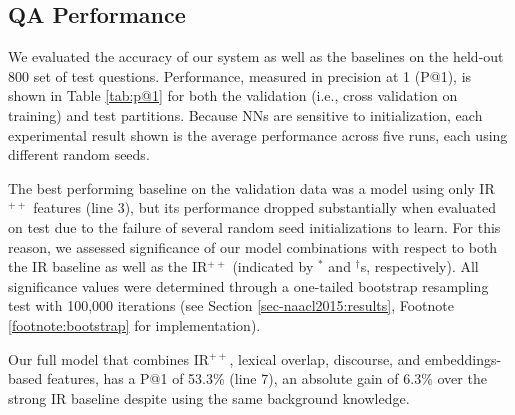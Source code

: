 \subsection{QA Performance}
\label{sec-emnlp2017:accuracy}
We evaluated the accuracy of our system as well as the baselines on the held-out 800 set of test questions.  Performance, measured in precision at 1 (P@1)\citep{manning08}, is shown in Table \ref{tab:p@1} for both the validation (i.e., cross validation on training) and test partitions.  Because NNs are sensitive to initialization, each experimental result shown is the average performance across five runs, each using different random seeds.   

The best performing baseline on the validation data was a model using only IR$^{++}$ features (line 3), but its performance dropped substantially when evaluated on test due to the failure of several random seed initializations to learn.  For this reason, we assessed significance of our model combinations with respect to both the IR baseline as well as the IR$^{++}$ (indicated by $^*$ and $^{\dagger}$s, respectively). All significance values were determined through a one-tailed bootstrap resampling test with 100,000 iterations (see Section \ref{sec-naacl2015:results}, Footnote \ref{footnote:bootstrap} for implementation).

Our full model that combines IR$^{++}$, lexical overlap, discourse, and embeddings-based features, has a P@1 of 53.3\% (line 7), an absolute gain of 6.3\% over the strong IR baseline despite using the same background knowledge.  

